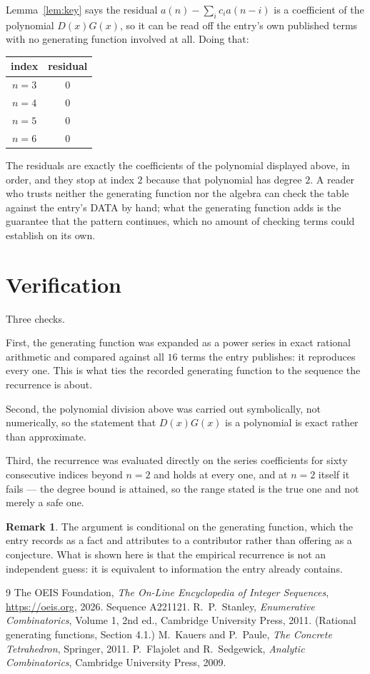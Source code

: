 \documentclass[11pt,a4paper]{article}
\theoremstyle{plain}
\theoremstyle{definition}
\newtheorem{remark}[theorem]{Remark}
\begin{document}
Lemma~\ref{lem:key} says the residual $a(n)-\sum_ic_ia(n-i)$ is a coefficient of the
polynomial $D(x)G(x)$, so it can be read off the entry's own published terms with no
generating function involved at all. Doing that:
\begin{center}
\begin{tabular}{cc}
index & residual \\ \hline
$n=3$ & $0$ \\
$n=4$ & $0$ \\
$n=5$ & $0$ \\
$n=6$ & $0$
\end{tabular}
\end{center}
The residuals are exactly the coefficients of the polynomial displayed above, in order, and
they stop at index $2$ because that polynomial has degree $2$. A reader who trusts
neither the generating function nor the algebra can check the table against the entry's DATA
by hand; what the generating function adds is the guarantee that the pattern continues, which
no amount of checking terms could establish on its own.

\section{Verification}

Three checks.

First, the generating function was expanded as a power series in exact rational arithmetic and
compared against all $16$ terms the entry publishes: it reproduces every one. This is
what ties the recorded generating function to the sequence the recurrence is about.

Second, the polynomial division above was carried out symbolically, not numerically, so the
statement that $D(x)G(x)$ is a polynomial is exact rather than approximate.

Third, the recurrence was evaluated directly on the series coefficients for sixty consecutive
indices beyond $n=2$ and holds at every one, and at $n=2$ itself it fails --- the
degree bound is attained, so the range stated is the true one and not merely a safe one.

\begin{remark}
The argument is conditional on the generating function, which the entry records as a fact and
attributes to a contributor rather than offering as a conjecture. What is shown here is that
the empirical recurrence is not an independent guess: it is equivalent to information the
entry already contains.
\end{remark}

\begin{thebibliography}{9}
 The OEIS Foundation, \emph{The On-Line Encyclopedia of Integer
Sequences}, \url{https://oeis.org}, 2026. Sequence A221121.
 R.~P.~Stanley, \emph{Enumerative Combinatorics}, Volume 1, 2nd ed.,
Cambridge University Press, 2011. (Rational generating functions, Section 4.1.)
 M.~Kauers and P.~Paule, \emph{The Concrete Tetrahedron}, Springer, 2011.
 P.~Flajolet and R.~Sedgewick, \emph{Analytic Combinatorics}, Cambridge
University Press, 2009.
\end{thebibliography}
\end{document}
